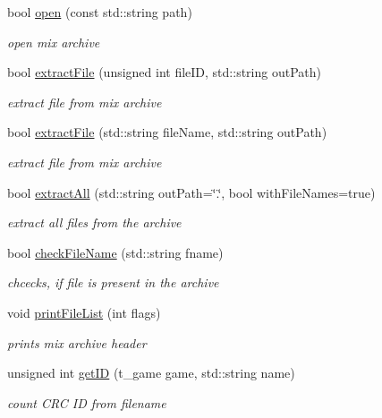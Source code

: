 \begin{DoxyCompactItemize}
\item 
bool \hyperlink{class_mix_file_a34cecccdab75e6533ed3cec0aaa1eae1}{open} (const std::string path)
\begin{DoxyCompactList}\small\item\em open mix archive \end{DoxyCompactList}\item 
bool \hyperlink{class_mix_file_a458c3723fe0f985a61e2063568f872fb}{extractFile} (unsigned int fileID, std::string outPath)
\begin{DoxyCompactList}\small\item\em extract file from mix archive \end{DoxyCompactList}\item 
bool \hyperlink{class_mix_file_a05fa448bc3507d58b85cfa3831c2f3b2}{extractFile} (std::string fileName, std::string outPath)
\begin{DoxyCompactList}\small\item\em extract file from mix archive \end{DoxyCompactList}\item 
bool \hyperlink{class_mix_file_a2016aa142da853224c86ef7aa17ef657}{extractAll} (std::string outPath=\char`\"{}.\char`\"{}, bool withFileNames=true)
\begin{DoxyCompactList}\small\item\em extract all files from the archive \end{DoxyCompactList}\item 
bool \hyperlink{class_mix_file_aa3c889a76f66b8508d38d63ccba3412b}{checkFileName} (std::string fname)
\begin{DoxyCompactList}\small\item\em chcecks, if file is present in the archive \end{DoxyCompactList}\item 
void \hyperlink{class_mix_file_a0bc648cc742736c22513d394946e75fe}{printFileList} (int flags)
\begin{DoxyCompactList}\small\item\em prints mix archive header \end{DoxyCompactList}\item 
unsigned int \hyperlink{class_mix_file_ab93f997c8a613ba0bee8a3d9a28de01b}{getID} (t\_\-game game, std::string name)
\begin{DoxyCompactList}\small\item\em count CRC ID from filename \end{DoxyCompactList}\end{DoxyCompactItemize}


